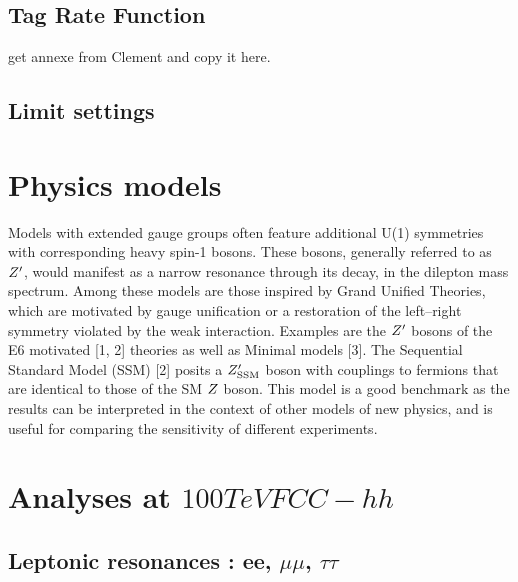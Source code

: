 \documentclass{cernrep}
\begin{document}
\clearpage
\newpage

\subsection{Tag Rate Function}
\label{subsec:trf}
get annexe from Clement and copy it here.

\subsection{Limit settings}
\label{subsec:limitsettings}


\section{Physics models}
\label{sec:physmodel}

Models with extended gauge groups often feature additional U(1) symmetries with corresponding heavy spin-1 bosons. These bosons, generally referred to as $Z^{\prime}$, would manifest as a narrow resonance through
its  decay,  in  the  dilepton  mass  spectrum.   
Among  these  models  are  those  inspired  by  Grand  Unified Theories, which are 
motivated by gauge unification or a restoration of the left–right symmetry violated
by the weak interaction. Examples are the $Z^{\prime}$
bosons of the E6 motivated [1, 2] theories as well as Minimal models [3].  
The Sequential Standard Model (SSM) [2] posits a $Z^{\prime}_{\mathrm{SSM}}$ boson with couplings to fermions
that are identical to those of the SM $Z$ boson. This model is a good benchmark as the 
results can be interpreted in the context of other models of new physics, and is useful 
for comparing the sensitivity of different experiments.



\section{Analyses at $100 TeV FCC-hh$}
\label{sec:ana100tev}

\subsection{Leptonic resonances : ee, $\mu\mu$, $\tau\tau$}
\label{subsec:lepreso}
\end{document}
